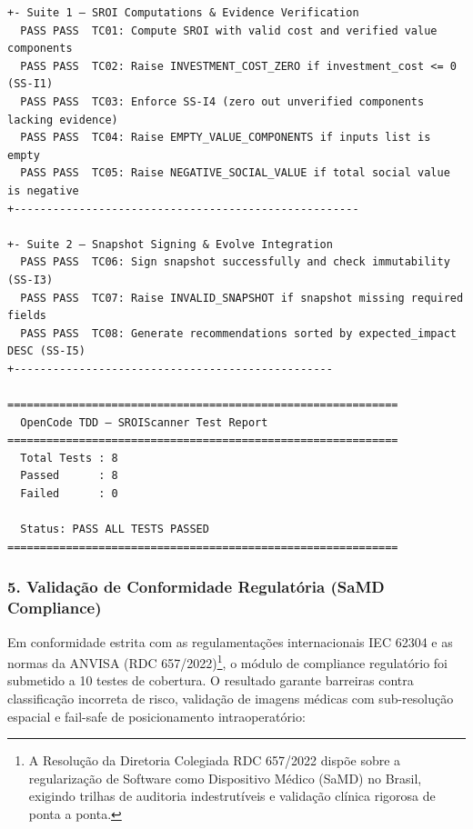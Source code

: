 \begin{lstlisting}[style=bashstyle, caption={Saída do Executor de Testes do OpenCode SROIScanner}, label={lst:tdd_ss_output}]
+- Suite 1 — SROI Computations & Evidence Verification
  PASS PASS  TC01: Compute SROI with valid cost and verified value components
  PASS PASS  TC02: Raise INVESTMENT_COST_ZERO if investment_cost <= 0 (SS-I1)
  PASS PASS  TC03: Enforce SS-I4 (zero out unverified components lacking evidence)
  PASS PASS  TC04: Raise EMPTY_VALUE_COMPONENTS if inputs list is empty
  PASS PASS  TC05: Raise NEGATIVE_SOCIAL_VALUE if total social value is negative
+-----------------------------------------------------

+- Suite 2 — Snapshot Signing & Evolve Integration
  PASS PASS  TC06: Sign snapshot successfully and check immutability (SS-I3)
  PASS PASS  TC07: Raise INVALID_SNAPSHOT if snapshot missing required fields
  PASS PASS  TC08: Generate recommendations sorted by expected_impact DESC (SS-I5)
+-------------------------------------------------

============================================================
  OpenCode TDD — SROIScanner Test Report
============================================================
  Total Tests : 8
  Passed      : 8
  Failed      : 0

  Status: PASS ALL TESTS PASSED
============================================================
\end{lstlisting}

\subsubsection*{5. Validação de Conformidade Regulatória (SaMD Compliance)}

Em conformidade estrita com as regulamentações internacionais IEC 62304 e as normas da ANVISA (RDC 657/2022)\footnote{A Resolução da Diretoria Colegiada RDC 657/2022 dispõe sobre a regularização de Software como Dispositivo Médico (SaMD) no Brasil, exigindo trilhas de auditoria indestrutíveis e validação clínica rigorosa de ponta a ponta.}, o módulo de compliance regulatório foi submetido a 10 testes de cobertura. O resultado garante barreiras contra classificação incorreta de risco, validação de imagens médicas com sub-resolução espacial e fail-safe de posicionamento intraoperatório:

